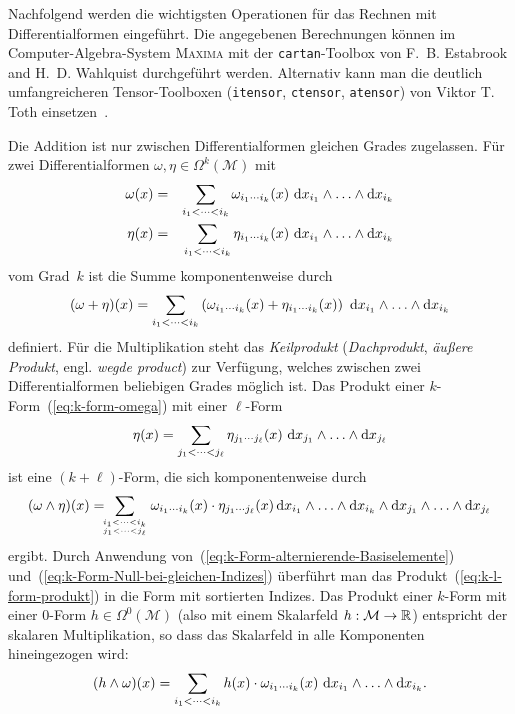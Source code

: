 Nachfolgend werden die wichtigsten Operationen für das Rechnen mit
Differentialformen eingeführt. Die angegebenen Berechnungen können
im Computer-Algebra-System \textsc{Maxima} mit der \texttt{cartan}-Toolbox
von F.~B. Estabrook and H.~D. Wahlquist durchgeführt werden. Alternativ
kann man die deutlich umfangreicheren Tensor-Toolboxen (\texttt{itensor},
\texttt{ctensor}, \texttt{atensor}) von Viktor T. Toth einsetzen~\cite{toth2005}.

Die Addition ist nur zwischen Differentialformen gleichen Grades zugelassen.
Für zwei Differentialformen $\omega,\eta\in\Omega^{k}(\mathcal{M})$
mit
\begin{eqnarray}
\omega(x) & = & \sum_{i_{1}<\cdots<i_{k}}\omega_{i_{1}\cdots i_{k}}(x)\ {\mathrm{d}} x_{i_{1}}\wedge\ldots\wedge{\mathrm{d}} x_{i_{k}}\label{eq:k-form-omega}\\
\eta(x) & = & \sum_{i_{1}<\cdots<i_{k}}\eta_{i_{1}\cdots i_{k}}(x)\ {\mathrm{d}} x_{i_{1}}\wedge\ldots\wedge{\mathrm{d}} x_{i_{k}}\label{eq:k-form-eta}
\end{eqnarray}
vom Grad~$k$ ist die Summe komponentenweise durch
\begin{equation}
(\omega+\eta)(x)=\sum_{i_{1}<\cdots<i_{k}}\left(\omega_{i_{1}\cdots i_{k}}(x)+\eta_{i_{1}\cdots i_{k}}(x)\right)\ {\mathrm{d}} x_{i_{1}}\wedge\ldots\wedge{\mathrm{d}} x_{i_{k}}\label{eq:k-form-summe}
\end{equation}
definiert. Für die Multiplikation steht das \emph{Keilprodukt}
(\emph{Dachprodukt}, \emph{äußere
Produkt},
engl. \emph{wegde product}) zur Verfügung, welches zwischen zwei Differentialformen
beliebigen Grades möglich ist. Das Produkt einer $k$-Form~(\ref{eq:k-form-omega})
mit einer $\ell$-Form
\[
\eta(x)=\sum_{j_{1}<\cdots<j_{\ell}}\eta_{j_{1}\cdots j_{\ell}}(x)\ {\mathrm{d}} x_{j_{1}}\wedge\ldots\wedge{\mathrm{d}} x_{j_{\ell}}
\]
ist eine $(k+\ell)$-Form, die sich komponentenweise durch
\begin{equation}
(\omega\wedge\eta)(x)=\!\!\!\sum\limits _{{i_{1}<\cdots<i_{k}\atop j_{1}<\cdots<j_{\ell}}}\omega_{i_{1}\cdots i_{k}}(x)\cdot\eta_{j_{1}\cdots j_{\ell}}(x)\,{\mathrm{d}} x_{i_{1}}\wedge\ldots\wedge{\mathrm{d}} x_{i_{k}}\wedge{\mathrm{d}} x_{j_{1}}\wedge\ldots\wedge{\mathrm{d}} x_{j_{\ell}}\label{eq:k-l-form-produkt}
\end{equation}
ergibt. Durch Anwendung von~(\ref{eq:k-Form-alternierende-Basiselemente})
und~(\ref{eq:k-Form-Null-bei-gleichen-Indizes}) überführt man das
Produkt~(\ref{eq:k-l-form-produkt}) in die Form mit sortierten Indizes.
Das Produkt einer $k$-Form mit einer $0$-Form $h\in\Omega^{0}(\mathcal{M})$
(also mit einem Skalarfeld $h:\mathcal{M}\to{\mathbb{R}}$) entspricht der skalaren
Multiplikation, so dass das Skalarfeld in alle Komponenten hineingezogen
wird:
\begin{equation}
(h\wedge\omega)(x)=\sum_{i_{1}<\cdots<i_{k}}h(x)\cdot\omega_{i_{1}\cdots i_{k}}(x)\ {\mathrm{d}} x_{i_{1}}\wedge\ldots\wedge{\mathrm{d}} x_{i_{k}}.\label{eq:produkt-mit-nullform}
\end{equation}

